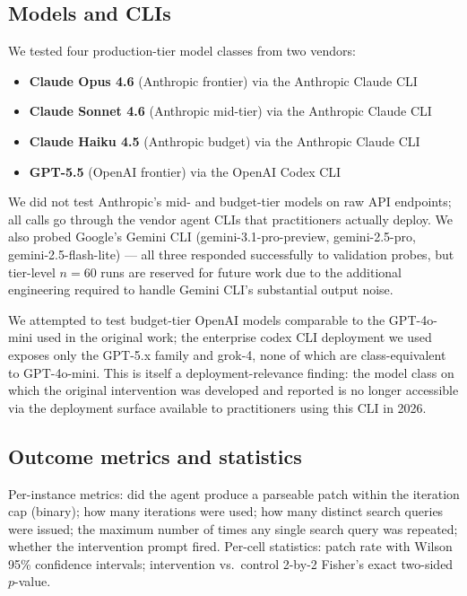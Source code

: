\documentclass[journal]{IEEEtran}
\begin{document}
\subsection{Models and CLIs}

We tested four production-tier model classes from two vendors:

\begin{itemize}[leftmargin=*,nosep]
\item \textbf{Claude Opus 4.6} (Anthropic frontier) via the Anthropic Claude CLI
\item \textbf{Claude Sonnet 4.6} (Anthropic mid-tier) via the Anthropic Claude CLI
\item \textbf{Claude Haiku 4.5} (Anthropic budget) via the Anthropic Claude CLI
\item \textbf{GPT-5.5} (OpenAI frontier) via the OpenAI Codex CLI
\end{itemize}

We did not test Anthropic's mid- and budget-tier models on raw API endpoints; all calls go through the vendor agent CLIs that practitioners actually deploy. We also probed Google's Gemini CLI (gemini-3.1-pro-preview, gemini-2.5-pro, gemini-2.5-flash-lite) — all three responded successfully to validation probes, but tier-level $n{=}60$ runs are reserved for future work due to the additional engineering required to handle Gemini CLI's substantial output noise.

We attempted to test budget-tier OpenAI models comparable to the GPT-4o-mini used in the original work; the enterprise codex CLI deployment we used exposes only the GPT-5.x family and grok-4, none of which are class-equivalent to GPT-4o-mini. This is itself a deployment-relevance finding: the model class on which the original intervention was developed and reported is no longer accessible via the deployment surface available to practitioners using this CLI in 2026.

\subsection{Outcome metrics and statistics}

Per-instance metrics: did the agent produce a parseable patch within the iteration cap (binary); how many iterations were used; how many distinct search queries were issued; the maximum number of times any single search query was repeated; whether the intervention prompt fired. Per-cell statistics: patch rate with Wilson 95\% confidence intervals; intervention vs.\ control 2-by-2 Fisher's exact two-sided $p$-value.
\end{document}
